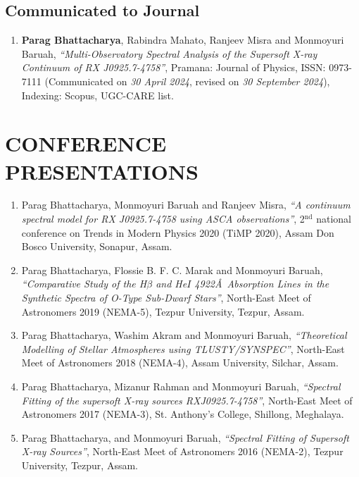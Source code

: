     	\subsection{Communicated to Journal}
    		\begin{enumerate}
    			\item \textbf{Parag Bhattacharya}, Rabindra Mahato, Ranjeev Misra and Monmoyuri Baruah, \textit{``Multi-Observatory Spectral Analysis of the Supersoft X-ray Continuum of RX J0925.7-4758''}, Pramana: Journal of Physics, ISSN: 0973-7111 (Communicated on \textit{30 April 2024}, revised on \textit{30 September 2024}), Indexing: Scopus, UGC-CARE list. \label{paper-pram}
    		\end{enumerate}
    
    \section{\MakeUppercase{Conference Presentations}}
        \begin{enumerate}
            \item Parag Bhattacharya, Monmoyuri Baruah and Ranjeev Misra, \textit{``A continuum spectral model for RX J0925.7-4758 using ASCA observations''}, 2$^{\text{nd}}$ national conference on Trends in Modern Physics 2020 (TiMP 2020), Assam Don Bosco University, Sonapur, Assam.
            
            \item Parag Bhattacharya, Flossie B. F. C. Marak and Monmoyuri Baruah, \textit{``Comparative Study of the H$\beta$ and He$I$ 4922\AA\ Absorption Lines in the Synthetic Spectra of O-Type Sub-Dwarf Stars''}, North-East Meet of Astronomers 2019 (NEMA-5), Tezpur University, Tezpur, Assam.
            
            \item Parag Bhattacharya, Washim Akram and Monmoyuri Baruah, \textit{``Theoretical Modelling of Stellar Atmospheres using TLUSTY/SYNSPEC''}, North-East Meet of Astronomers 2018 (NEMA-4), Assam University, Silchar, Assam.
            
            \item Parag Bhattacharya, Mizanur Rahman and Monmoyuri Baruah, \textit{``Spectral Fitting of the supersoft X-ray sources RXJ0925.7-4758''}, North-East Meet of Astronomers 2017 (NEMA-3), St. Anthony's College, Shillong, Meghalaya.
            
            \item Parag Bhattacharya, and Monmoyuri Baruah, \textit{``Spectral Fitting of Supersoft X-ray Sources''}, North-East Meet of Astronomers 2016 (NEMA-2), Tezpur University, Tezpur, Assam.
        \end{enumerate}
        
